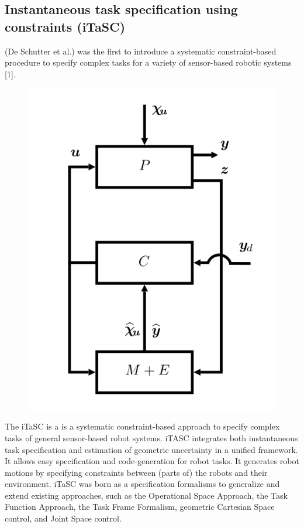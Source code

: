 \subsection{Instantaneous task specification using constraints (iTaSC)}
(De Schutter et al.) was the first to introduce a systematic constraint-based procedure to specify complex tasks for a variety of sensor-based robotic systems [1].

\begin{figure}[h!]
	\centering
	\includegraphics[scale=0.5]{images/General-control-scheme.png}
\end{figure}
The iTaSC is a is a systematic constraint-based approach to specify complex tasks of general sensor-based robot systems. iTASC integrates both instantaneous task specification and estimation of geometric uncertainty in a unified framework. It allows easy specification and code-generation for robot tasks. It generates robot motions by specifying constraints between (parts of) the robots and their environment. iTaSC was born as a specification formalisms to generalize and extend existing approaches, such as the Operational Space Approach, the Task Function Approach, the Task Frame Formalism, geometric Cartesian Space control, and Joint Space control.

